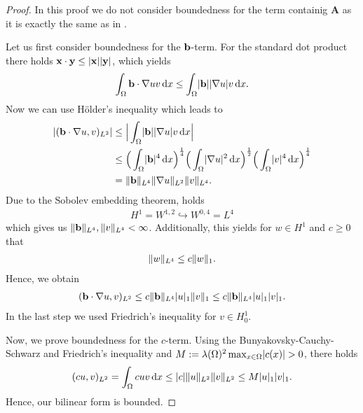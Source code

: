 \begin{proof}
  In this proof we do not consider boundedness for the term containig
  $\mathbf A$ as it is exactly the same as in
  .

  Let us first consider boundedness for the $\mathbf b$-term.
  For the standard dot product there holds
  $\mathbf x\cdot \mathbf y\leq \lvert\mathbf x\rvert\lvert\mathbf y\rvert$, which yields
  \begin{align*}
    \int_\Omega \mathbf b\cdot\nabla u v \,\mathrm{d} x \le \int_\Omega \lvert\mathbf b\rvert\lvert\nabla u\rvert v\,\mathrm{d} x.
  \end{align*}
  Now we can use Hölder's inequality which leads to
  \begin{align*}
    \lvert(\mathbf b\cdot\nabla u,v)_{L^2}\rvert&\le \Big| \int_\Omega\lvert\mathbf b\rvert\lvert\nabla u\rvert v\,\mathrm{d} x \Big| \\
    &\le \Big(\int_\Omega \lvert\mathbf b\rvert^4\,\mathrm{d} x \Big)^{\frac14} \Big(\int_\Omega \lvert\nabla u\rvert^2\,\mathrm{d} x \Big)^{\frac12}
    \Big(\int_\Omega \lvert v\rvert^4 \,\mathrm{d} x\Big)^{\frac14} \\
    &= \lVert\mathbf b\rVert_{L^4} \lVert\nabla u\rVert_{L^2} \lVert v\rVert_{L^4}.
  \end{align*}
  Due to the Sobolev embedding theorem, holds
  \begin{align*}
    H^1 = W^{1,2} \hookrightarrow W^{0,4} = L^4
  \end{align*}
  which gives us $\lVert\mathbf b\rVert_{L^4},\lVert v\rVert_{L^4}<\infty$.
  Additionally, this yields for $w\in H^1$ and $c\ge 0$ that
  \begin{align*}
    \lVert w\rVert_{L^4} \le c \lVert w\rVert_1.
  \end{align*}
  Hence, we obtain
  \begin{align*}
    (\mathbf b\cdot\nabla u,v)_{L^2} \le c \lVert\mathbf b\rVert_{L^4} \lvert u\rvert_1 \lVert v\rVert_1
    \le c \lVert\mathbf b\rVert_{L^4} \lvert u\rvert_1 \lvert v\rvert_1.
  \end{align*}
  In the last step we used Friedrich's inequality for $v\in H^1_0$.
  
  Now, we prove boundedness for the $c$-term.
  Using the Bunyakovsky-Cauchy-Schwarz and Friedrich's inequality and
  $M:=\lambda(\Omega)^2 \max_{x\in\Omega}\lvert c(x)\rvert>0$, there holds
  \begin{align*}
    (cu,v)_{L^2} = \int_\Omega cuv\,\mathrm{d} x \le \lvert c\rvert \lVert u\rVert_{L^2} \lVert v\rVert_{L^2} \le M \lvert u\rvert_1 \lvert v\rvert_1.
  \end{align*}
  Hence, our bilinear form is bounded.


\end{proof}
